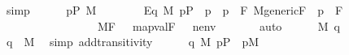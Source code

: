 \begin{isabellebody}
\ simp\isanewline
\ \ \ \ \isamarkupfalse%
\ {\isacartoucheopen}p{\isasymin}P{\isacartoucheclose}\ {\isacartoucheopen}{\isasymtheta}{\isasymin}M{\isacartoucheclose}\ \ \isanewline
\ \ \ \ \isamarkupfalse%
\ Eq{}{\isacharcolon}{\kern0pt}\ {\isachardoublequoteopen}{\isasymexists}{\isasymtheta}{\isacharprime}{\kern0pt}{\isasymin}M{\isachardot}{\kern0pt}\ {\isasymexists}p{\isacharprime}{\kern0pt}{\isasymin}P{\isachardot}{\kern0pt}\ \ {\isasymlangle}{\isasymtheta}{\isacharcomma}{\kern0pt}p{\isasymrangle}\ {\isacharequal}{\kern0pt}\ {\isacharless}{\kern0pt}{\isasymtheta}{\isacharprime}{\kern0pt}{\isacharcomma}{\kern0pt}p{\isacharprime}{\kern0pt}{\isachargreater}{\kern0pt}\ {\isasymand}\ {\isacharparenleft}{\kern0pt}{\isasymforall}F{\isachardot}{\kern0pt}\ M{\isacharunderscore}{\kern0pt}generic{\isacharparenleft}{\kern0pt}F{\isacharparenright}{\kern0pt}\ {\isasymand}\ p{\isacharprime}{\kern0pt}\ {\isasymin}\ F\ {\isasymlongrightarrow}\ \isanewline
\ \ \ \ \ \ \ \ \ \ \ \ \ \ \ \ \ M{\isacharbrackleft}{\kern0pt}F{\isacharbrackright}{\kern0pt}{\isacharcomma}{\kern0pt}\ \ \ map{\isacharparenleft}{\kern0pt}val{\isacharparenleft}{\kern0pt}F{\isacharparenright}{\kern0pt}{\isacharcomma}{\kern0pt}\ {\isacharbrackleft}{\kern0pt}{\isasymtheta}{\isacharprime}{\kern0pt}{\isacharbrackright}{\kern0pt}\ {\isacharat}{\kern0pt}\ nenv\ {\isacharat}{\kern0pt}\ {\isacharbrackleft}{\kern0pt}{\isasympi}{\isacharbrackright}{\kern0pt}{\isacharparenright}{\kern0pt}\ {\isasymTurnstile}\ \ {\isacharquery}{\kern0pt}{\isasymchi}{\isacharparenright}{\kern0pt}{\isachardoublequoteclose}\ \isamarkupfalse%
\ auto\isanewline
\ \ \ \ \isamarkupfalse%
\ {\isacartoucheopen}{\isasympi}{\isasymin}M{\isacartoucheclose}\ {\isacartoucheopen}{\isasymlangle}{\isasymtheta}{\isacharcomma}{\kern0pt}q{\isasymrangle}{\isasymin}{\isasympi}{\isacartoucheclose}\ \isanewline
\ \ \ \ \isamarkupfalse%
\ {\isachardoublequoteopen}{\isasymlangle}{\isasymtheta}{\isacharcomma}{\kern0pt}q{\isasymrangle}\ {\isasymin}\ M{\isachardoublequoteclose}\ \isamarkupfalse%
\ {\isacharparenleft}{\kern0pt}simp\ add{\isacharcolon}{\kern0pt}transitivity{\isacharparenright}{\kern0pt}\isanewline
\ \ \ \ \isamarkupfalse%
\ {\isacartoucheopen}{\isasymlangle}{\isasymtheta}{\isacharcomma}{\kern0pt}q{\isasymrangle}{\isasymin}{\isasympi}{\isacartoucheclose}\ {\isacartoucheopen}{\isasymtheta}{\isasymin}M{\isacartoucheclose}\ {\isacartoucheopen}p{\isasymin}P{\isacartoucheclose}\ \ {\isacartoucheopen}p{\isasymin}M{\isacartoucheclose}\ \isanewline

\end{isabellebody}
